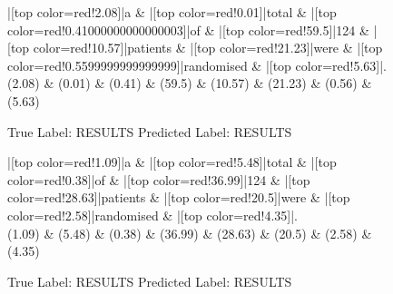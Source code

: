 \documentclass[a4paper, landscape]{article}
\begin{document}
\clearpage
\begin{figure}
\begin{center}
\begin{dependency}
\begin{deptext}
|[top color=red!2.08]|a \& |[top color=red!0.01]|total \& |[top color=red!0.41000000000000003]|of \& |[top color=red!59.5]|124 \& |[top color=red!10.57]|patients \& |[top color=red!21.23]|were \& |[top color=red!0.5599999999999999]|randomised \& |[top color=red!5.63]|.\\
(2.08) \& (0.01) \& (0.41) \& (59.5) \& (10.57) \& (21.23) \& (0.56) \& (5.63)\\
\end{deptext}
\end{dependency}
\end{center}
\caption{True Label: RESULTS Predicted Label: RESULTS}
\end{figure}
\clearpage
\begin{figure}
\begin{center}
\begin{dependency}
\begin{deptext}
|[top color=red!1.09]|a \& |[top color=red!5.48]|total \& |[top color=red!0.38]|of \& |[top color=red!36.99]|124 \& |[top color=red!28.63]|patients \& |[top color=red!20.5]|were \& |[top color=red!2.58]|randomised \& |[top color=red!4.35]|.\\
(1.09) \& (5.48) \& (0.38) \& (36.99) \& (28.63) \& (20.5) \& (2.58) \& (4.35)\\
\end{deptext}
\end{dependency}
\end{center}
\caption{True Label: RESULTS Predicted Label: RESULTS}
\end{figure}
\clearpage
\end{document}
